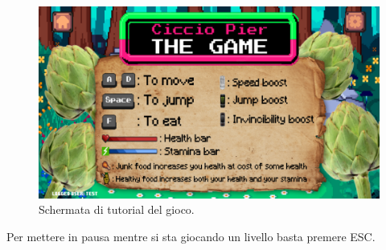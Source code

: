 \documentclass[a4paper,12pt]{report}
\begin{document}
\begin{figure}[H]
\centering{}
\includegraphics[scale=0.2] {img/game-tutorial.png}
\caption{Schermata di tutorial del gioco.}
\label{img:game-tutorial}
\end{figure}

Per mettere in pausa mentre si sta giocando un livello basta premere ESC.



\end{document}

